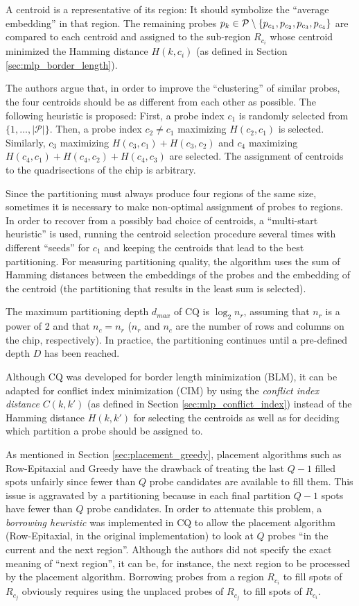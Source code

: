 A centroid is a representative of its region: It should symbolize the ``average
embedding'' in that region. The remaining probes
$p_k \in {\mathcal{P}} \setminus \{p_{c_1},p_{c_2},p_{c_3},p_{c_4}\}$ are compared to
each centroid and assigned to the sub-region $R_{c_i}$ whose centroid minimized
the Hamming distance $H(k,c_i)$ (as defined in Section
\ref{sec:mlp_border_length}).

The authors argue that, in order to improve the ``clustering'' of similar
probes, the four centroids should be as different from each other as possible.
The following heuristic is proposed: First, a probe index $c_1$ is randomly
selected from $\{1,\dots,|\mathcal{P}|\}$.  Then, a probe index $c_2\neq c_1$
maximizing $H(c_2,c_1)$ is selected.  Similarly, $c_3$ maximizing
$H(c_3,c_1) + H(c_3,c_2)$ and $c_4$ maximizing
$H(c_4,c_1) + H(c_4,c_2) + H(c_4,c_3)$ are selected.  The assignment of
centroids to the quadrisections of the chip is arbitrary.

Since the partitioning must always produce four regions of the same size,
sometimes it is necessary to make non-optimal assignment of probes to regions.
In order to recover from a possibly bad choice of centroids, a ``multi-start
heuristic'' is used, running the centroid selection procedure several times with
different ``seeds'' for $c_1$ and keeping the centroids that lead to the best
partitioning. For measuring partitioning quality, the algorithm uses the sum of
Hamming distances between the embeddings of the probes and the embedding of the
centroid (the partitioning that results in the least sum is selected).

The maximum partitioning depth $d_{max}$ of CQ is $\log_2 n_r$, assuming that
$n_r$ is a power of 2 and that $n_c=n_r$ ($n_r$ and $n_c$ are the number of rows
and columns on the chip, respectively). In practice, the partitioning continues
until a pre-defined depth $D$ has been reached.

Although CQ was developed for border length minimization (BLM), it can be
adapted for conflict index minimization (CIM) by using the \emph{conflict index
distance} $C(k,k')$ (as defined in Section \ref{sec:mlp_conflict_index}) instead
of the Hamming distance $H(k,k')$ for selecting the centroids as well as for
deciding which partition a probe should be assigned to.

As mentioned in Section \ref{sec:placement_greedy}, placement algorithms such as
Row-Epitaxial and Greedy have the drawback of treating the last $Q - 1$ filled
spots unfairly since fewer than $Q$ probe candidates are available to fill them.
This issue is aggravated by a partitioning because in each final partition
$Q - 1$ spots have fewer than $Q$ probe candidates. In order to attenuate this
problem, a \emph{borrowing heuristic} was implemented in CQ to allow the
placement algorithm (Row-Epitaxial, in the original implementation) to look at
$Q$ probes ``in the current and the next region''. Although the authors did not
specify the exact meaning of ``next region'', it can be, for instance, the next
region to be processed by the placement algorithm. Borrowing probes from a
region $R_{c_i}$ to fill spots of $R_{c_j}$ obviously requires using the
unplaced probes of $R_{c_j}$ to fill spots of $R_{c_i}$.

